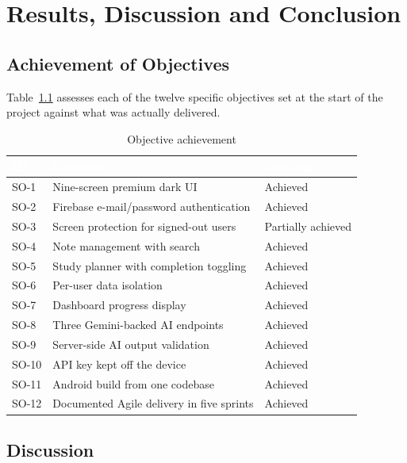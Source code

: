 \documentclass[12pt,a4paper,oneside]{report}
\begin{document}
\chapter{Results, Discussion and Conclusion}\label{ch:concl}

\section{Achievement of Objectives}

Table~\ref{tab:objresult} assesses each of the twelve specific objectives set at the start of the project against what was actually delivered.

\begin{table}[H]
\centering
\caption{Objective achievement}
\label{tab:objresult}
\small
\begin{tabularx}{\textwidth}{@{}p{1.4cm}Xp{2.3cm}@{}}
\toprule
\rowcolor{tblhead} \textcolor{white}{\textbf{ID}} &
\textcolor{white}{\textbf{Objective}} &
\textcolor{white}{\textbf{Outcome}} \\
\midrule
SO-1  & Nine-screen premium dark UI & Achieved \\
SO-2  & Firebase e-mail/password authentication & Achieved \\
SO-3  & Screen protection for signed-out users & Partially achieved \\
SO-4  & Note management with search & Achieved \\
SO-5  & Study planner with completion toggling & Achieved \\
SO-6  & Per-user data isolation & Achieved \\
SO-7  & Dashboard progress display & Achieved \\
SO-8  & Three Gemini-backed AI endpoints & Achieved \\
SO-9  & Server-side AI output validation & Achieved \\
SO-10 & API key kept off the device & Achieved \\
SO-11 & Android build from one codebase & Achieved \\
SO-12 & Documented Agile delivery in five sprints & Achieved \\
\bottomrule
\end{tabularx}
\end{table}

\section{Discussion}
\end{document}
